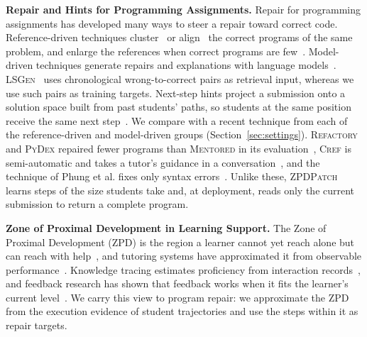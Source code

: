 \documentclass[10pt,conference]{IEEEtran}
\begin{document}
\noindent\textbf{Repair and Hints for Programming Assignments.} Repair for programming assignments has developed many ways to steer a repair toward correct code. Reference-driven techniques cluster~\cite{gulwani2018automated,glassman2015overcode} or align~\cite{wang2018search,hu2019re,xie2024brafar} the correct programs of the same problem, and enlarge the references when correct programs are few~\cite{choi2025automated}. Model-driven techniques generate repairs and explanations with language models~\cite{heo2023referent,zhang2024pydex,phung2023generating,yang2024cref}. \textsc{LSGen}~\cite{dai2026learner} uses chronological wrong-to-correct pairs as retrieval input, whereas we use such pairs as training targets. Next-step hints project a submission onto a solution space built from past students' paths, so students at the same position receive the same next step~\cite{rivers2017data,price2017isnap,roest2024next}. We compare with a recent technique from each of the reference-driven and model-driven groups (Section~\ref{sec:settings}). \textsc{Refactory} and \textsc{PyDex} repaired fewer programs than \textsc{Mentored} in its evaluation~\cite{choi2025automated}, \textsc{Cref} is semi-automatic and takes a tutor's guidance in a conversation~\cite{yang2024cref}, and the technique of Phung et al. fixes only syntax errors~\cite{phung2023generating}. Unlike these, \textsc{ZPDPatch} learns steps of the size students take and, at deployment, reads only the current submission to return a complete program.

\noindent\textbf{Zone of Proximal Development in Learning Support.} The Zone of Proximal Development (ZPD) is the region a learner cannot yet reach alone but can reach with help~\cite{vygotsky1978mind}, and tutoring systems have approximated it from observable performance~\cite{murray2002toward,chounta2017grey,schulze2024beyond}. Knowledge tracing estimates proficiency from interaction records~\cite{corbett1994knowledge,piech2015deep}, and feedback research has shown that feedback works when it fits the learner's current level~\cite{hattie2007power,shute2008focus,narciss2008feedback}. We carry this view to program repair: we approximate the ZPD from the execution evidence of student trajectories and use the steps within it as repair targets.
\end{document}
